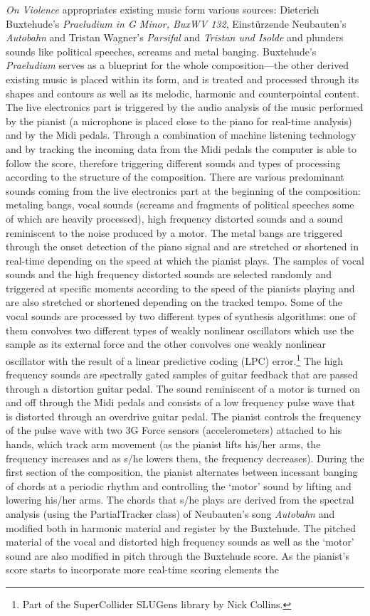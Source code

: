 \emph{On Violence} appropriates existing music form various sources: Dieterich Buxtehude's \emph{Praeludium in G Minor, BuxWV 132}, Einst\"{u}rzende Neubauten's \emph{Autobahn} and  Tristan Wagner's \emph{Parsifal} and \emph{Tristan und Isolde} and plunders sounds like political speeches, screams and metal banging. Buxtehude's \emph{Praeludium} serves as a blueprint for the whole composition---the other derived existing music is placed within its form, and is treated and processed through its shapes and contours as well as its melodic, harmonic and counterpointal content. The live electronics part is triggered by the audio analysis of the music performed by the pianist (a microphone is placed close to the piano for real-time analysis) and by the Midi pedals. Through a combination of machine listening technology and by tracking the incoming data from the Midi pedals the computer is able to follow the score, therefore triggering different sounds and types of processing according to the structure of the composition. There are various predominant sounds coming from the live electronics part at the beginning of the composition: metaling bangs, vocal sounds (screams and fragments of political speeches some of which are heavily processed), high frequency distorted sounds and a sound reminiscent to the noise produced by a motor. The metal bangs are triggered through the onset detection of the piano signal and are stretched or shortened in real-time depending on the speed at which the pianist plays. The samples of vocal sounds and the high frequency distorted sounds are selected randomly and triggered at specific moments according to the speed of the pianists playing and are also stretched or shortened depending on the tracked tempo. Some of the vocal sounds are processed by two different types of synthesis algorithms: one of them convolves two different types of weakly nonlinear oscillators which use the sample as its external force and the other convolves one weakly nonlinear oscillator with the result of a linear predictive coding (LPC) error.\footnote{Part of the SuperCollider SLUGens library by Nick Collins.} The high frequency sounds are spectrally gated samples of guitar feedback that are passed through a distortion guitar pedal. The sound reminiscent of a motor is turned on and off through the Midi pedals and consists of a low frequency pulse wave that is distorted through an overdrive guitar pedal. The pianist controls the frequency of the pulse wave with two 3G Force sensors (accelerometers) attached to his hands, which track arm movement (as the pianist lifts his/her arms, the frequency increases and as s/he lowers them, the frequency decreases). During the first section of the composition, the pianist alternates between incessant banging of chords at a periodic rhythm and controlling the `motor' sound by lifting and lowering his/her arms. The chords that s/he plays are derived from the spectral analysis (using the PartialTracker class) of Neubauten's song \emph{Autobahn} and modified both in harmonic material and register by the Buxtehude. The pitched material of the vocal and distorted high frequency sounds as well as the `motor' sound are also modified in pitch through the Buxtehude score. As the pianist's score starts to incorporate more real-time scoring elements the 